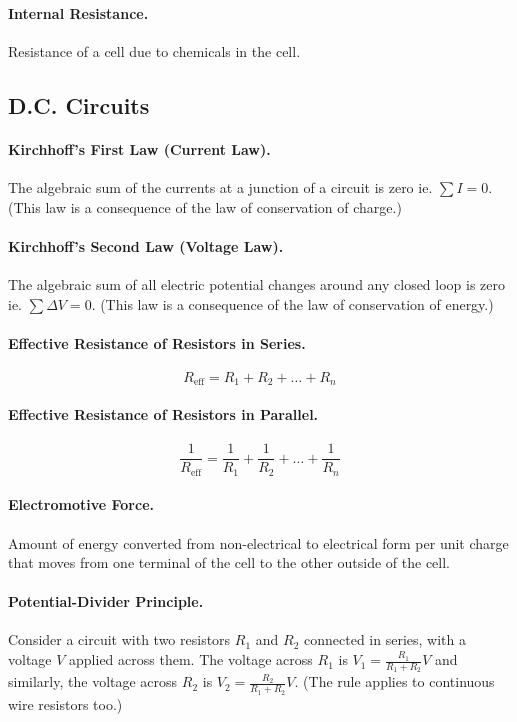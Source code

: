 \documentclass{article}
\begin{document}
\paragraph{Internal Resistance.} Resistance of a cell due to chemicals in the cell.

\subsection{D.C. Circuits}

\paragraph{Kirchhoff's First Law (Current Law).} The algebraic sum of the currents at a junction of a circuit is zero ie. $\sum I = 0$. (This law is a consequence of the law of conservation of charge.)

\paragraph{Kirchhoff's Second Law (Voltage Law).} The algebraic sum of all electric potential changes around any closed loop is zero ie. $\sum \Delta V = 0$. (This law is a consequence of the law of conservation of energy.)

\paragraph{Effective Resistance of Resistors in Series.} \begin{equation}
R_{\text{eff}} = R_1 + R_2 + \ldots + R_n
\end{equation}

\paragraph{Effective Resistance of Resistors in Parallel.} \begin{equation}
\frac{1}{R_{\text{eff}}} = \frac{1}{R_1} + \frac{1}{R_2} + \ldots + \frac{1}{R_n}
\end{equation}

\paragraph{Electromotive Force.} Amount of energy converted from non-electrical to electrical form per unit charge that moves from one terminal of the cell to the other outside of the cell.

\paragraph{Potential-Divider Principle.} Consider a circuit with two resistors $R_1$ and $R_2$ connected in series, with a voltage $V$ applied across them. The voltage across $R_1$ is $V_1 = \frac{R_1}{R_1 + R_2}V$ and similarly, the voltage across $R_2$ is $V_2 = \frac{R_2}{R_1 + R_2}V$. (The rule applies to continuous wire resistors too.)
\end{document}
